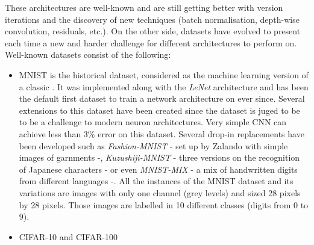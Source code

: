 These architectures are well-known and are still getting better with version iterations and the discovery of new techniques (batch normalisation, depth-wise convolution, residuals, etc.). On the other side, datasets have evolved to present each time a new and harder challenge for different architectures to perform on. Well-known datasets consist of the following:
\begin{itemize}
  \item MNIST is the historical dataset, considered as the machine learning version of a classic . It was implemented along with the \emph{LeNet} architecture and has been the default first dataset to train a network architecture on ever since. Several extensions to this dataset have been created since the dataset is juged to be  to be a challenge to modern neuron architectures. Very simple CNN can achieve less than 3\% error on this dataset. Several drop-in replacements have been developed such as \emph{Fashion-MNIST} \cite{Xiao2017} - set up by Zalando with simple images of garnments -, \emph{Kuzushiji-MNIST} \cite{Clanuwat2018} - three versions on the recognition of Japanese characters - or even \emph{MNIST-MIX} \cite{Jiang2020} - a mix of handwritten digits from different languages -. All the instances of the MNIST dataset and its variations are images with only one channel (grey levels) and sized 28 pixels by 28 pixels. Those images are labelled in 10 different classes (digits from 0 to 9).


  \item CIFAR-10 and CIFAR-100




\end{itemize}
